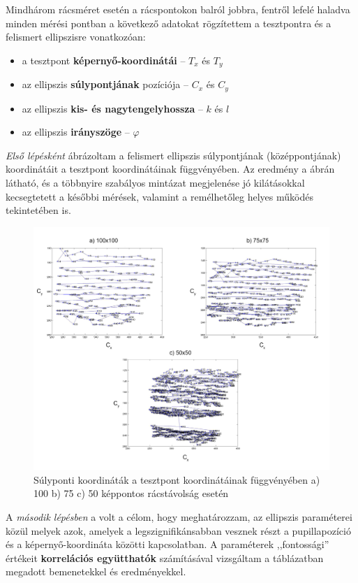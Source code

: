Mindhárom rácsméret esetén a rácspontokon balról jobbra, fentről lefelé haladva minden mérési pontban a következő adatokat rögzítettem a tesztpontra és a felismert ellipszisre vonatkozóan:

\begin{itemize}
  \item a tesztpont \textbf{képernyő-koordinátái} -- $T_x$ és $T_y$
  \item az ellipszis \textbf{súlypontjának} pozíciója -- $C_x$ és $C_y$
  \item az ellipszis \textbf{kis- és nagytengelyhossza} -- $k$ és $l$
  \item az ellipszis \textbf{irányszöge} -- $\varphi$
\end{itemize}

\emph{Első lépésként} ábrázoltam a felismert ellipszis súlypontjának (középpontjának) koordinátáit a tesztpont koordinátáinak függvényében. Az eredmény a  ábrán látható, és a többnyire szabályos mintázat megjelenése jó kilátásokkal kecsegtetett a későbbi mérések, valamint a remélhetőleg helyes működés tekintetében is.

\begin{figure}[!ht]
\centering
\includegraphics[width=150mm, keepaspectratio]{figures/calib_coords.png}
\caption{Súlyponti koordináták a tesztpont koordinátáinak függvényében a) 100 b) 75 c) 50 képpontos rácstávolság esetén}
\label{fig:calib_coords}
\end{figure}

A \emph{második lépésben} a volt a célom, hogy meghatározzam, az ellipszis paraméterei közül melyek azok, amelyek a legszignifikánsabban vesznek részt a pupillapozíció és a képernyő-koordináta közötti kapcsolatban. A paraméterek ,,fontossági'' értékeit \textbf{korrelációs együtthatók} számításával vizsgáltam a  táblázatban megadott bemenetekkel és eredményekkel. 


